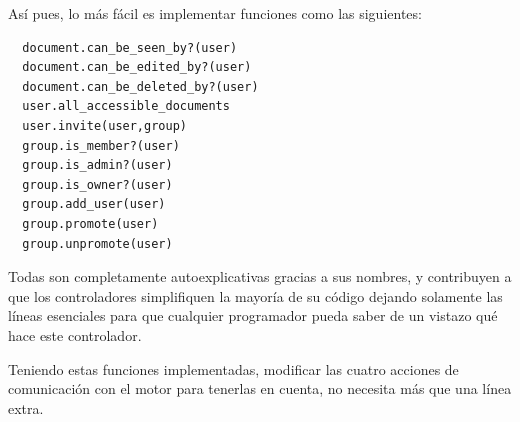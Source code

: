 Así pues, lo más fácil es implementar funciones como las siguientes:

\begin{verbatim}
  document.can_be_seen_by?(user)
  document.can_be_edited_by?(user)
  document.can_be_deleted_by?(user)
  user.all_accessible_documents
  user.invite(user,group)
  group.is_member?(user)
  group.is_admin?(user)
  group.is_owner?(user)
  group.add_user(user)
  group.promote(user)
  group.unpromote(user)
\end{verbatim}

Todas son completamente autoexplicativas gracias a sus nombres, y contribuyen a que los controladores simplifiquen la mayoría de su código dejando solamente las líneas esenciales para que cualquier programador pueda saber de un vistazo qué hace este controlador.

Teniendo estas funciones implementadas, modificar las cuatro acciones de comunicación con el motor para tenerlas en cuenta, no necesita más que una línea extra.


